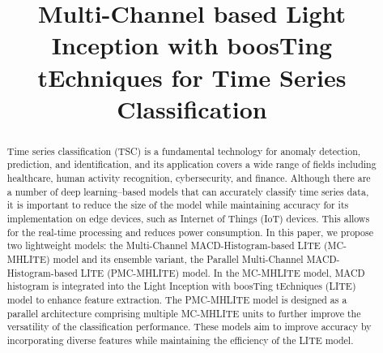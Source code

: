 \documentclass[conference]{IEEEtran}
\begin{document}
\title{Multi-Channel based Light Inception with boosTing tEchniques for Time Series Classification}

\author{
\and
{}
}

\maketitle

\begin{abstract}
Time series classification (TSC) is a fundamental technology for anomaly detection, prediction, and identification, and its application covers a wide range of fields including healthcare, human activity recognition, cybersecurity, and finance. Although there are a number of deep learning–based models that can accurately classify time series data, it is important to reduce the size of the model while maintaining accuracy for its implementation on edge devices, such as Internet of Things (IoT) devices. This allows for the real-time processing and reduces power consumption. In this paper, we propose two lightweight models: the Multi-Channel MACD-Histogram-based LITE (MC-MHLITE) model and its ensemble variant, the Parallel Multi-Channel MACD-Histogram-based LITE (PMC-MHLITE) model. In the MC-MHLITE model, MACD histogram is integrated into the Light Inception with boosTing tEchniques (LITE) model to enhance feature extraction. The PMC-MHLITE model is designed as a parallel architecture comprising multiple MC-MHLITE units to further improve the versatility of the classification performance. These models aim to improve accuracy by incorporating diverse features while maintaining the efficiency of the LITE model.
\end{abstract}
\end{document}
